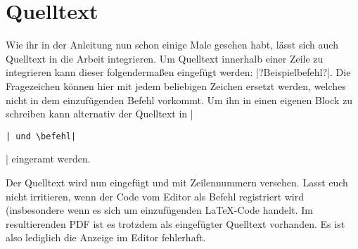 
\chapter{Quelltext}

Wie ihr in der Anleitung nun schon einige Male gesehen habt, lässt sich auch Quelltext in die Arbeit integrieren. 
Um Quelltext innerhalb einer Zeile zu integrieren kann dieser folgendermaßen eingefügt werden: \befehl|\befehl?Beispielbefehl?|. Die Fragezeichen können hier mit jedem beliebigen Zeichen ersetzt werden, welches nicht in dem einzufügenden Befehl vorkommt.
Um ihn in einen eigenen Block zu schreiben kann alternativ der Quelltext in \befehl|\begin{lstlisting}| und \befehl|\end{lstlisting}| eingeramt werden.


Der Quelltext wird nun eingefügt und mit Zeilennummern versehen. 
Lasst euch nicht irritieren, wenn der Code vom Editor als Befehl registriert wird (insbesondere wenn es sich um einzufügenden \LaTeX -Code handelt.  
Im resultierenden PDF ist es trotzdem als eingefügter Quelltext vorhanden. 
Es ist also lediglich die Anzeige im Editor fehlerhaft.
